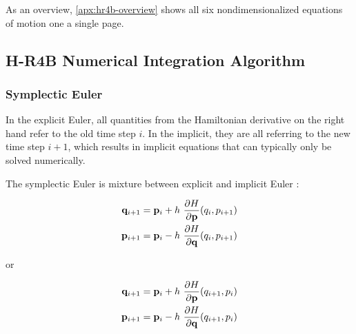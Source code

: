 As an overview, \cref{apx:hr4b-overview} shows all six nondimensionalized equations of motion one a single page.

\subsection{H-R4B Numerical Integration Algorithm}

\subsubsection{Symplectic Euler}
In the explicit Euler, all quantities from the Hamiltonian derivative on the right hand refer to the old time step \(i\). In the implicit, they are all referring to the new time step \(i+1\), which results in implicit equations that can typically only be solved numerically.

The symplectic Euler is mixture between explicit and implicit Euler \cite{Hairer}:

\begin{equation}
    \begin{split} \label{eq:symplectic-euler1}
        \mathbf{q}_{i+1} = \mathbf{p}_i + h \operatorname{}\frac{\partial H}{\partial \mathbf{p}}(q_i, p_{i+1}) \\
        \mathbf{p}_{i+1} = \mathbf{p}_i - h \operatorname{}\frac{\partial H}{\partial \mathbf{q}}(q_i, p_{i+1})
    \end{split}
\end{equation}

or

\begin{equation}
    \begin{split} \label{eq:symplectic-euler2}
        \mathbf{q}_{i+1} = \mathbf{p}_i + h \operatorname{}\frac{\partial H}{\partial \mathbf{p}}(q_{i+1}, p_i) \\
        \mathbf{p}_{i+1} = \mathbf{p}_i - h \operatorname{}\frac{\partial H}{\partial \mathbf{q}}(q_{i+1}, p_i)
    \end{split}
\end{equation}

